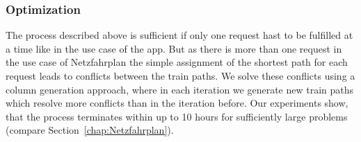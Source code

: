 \subsubsection{Optimization}
The process described above is sufficient if only one request hast to be fulfilled at a time like in the use case of the app. But as there is more than one request in the use case of Netzfahrplan the simple assignment of the shortest path for each request leads to conflicts between the train paths. We solve these conflicts using a column generation approach, where in each iteration we generate new train paths which resolve more conflicts than in the iteration before. Our experiments show, that the process terminates within up to 10 hours for sufficiently large problems (compare Section~\ref{chap:Netzfahrplan}).